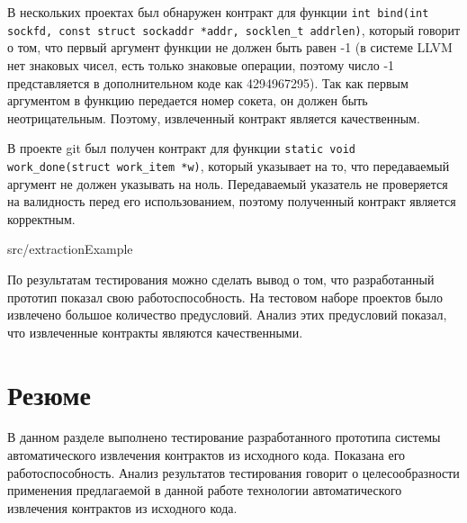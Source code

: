 В нескольких проектах был обнаружен контракт для функции \texttt{int bind(int sockfd, const struct sockaddr *addr, socklen_t addrlen)}, который говорит о том, что первый аргумент функции не должен быть равен -1 (в системе LLVM нет знаковых чисел, есть только знаковые операции, поэтому число -1 представляется в дополнительном коде как 4294967295). Так как первым аргументом в функцию передается номер сокета, он должен быть неотрицательным. Поэтому, извлеченный контракт является качественным.

В проекте git был получен контракт для функции \texttt{static void work_done(struct work_item *w)}, который указывает на то, что передаваемый аргумент не должен указывать на ноль. Передаваемый указатель не проверяется на валидность перед его использованием, поэтому полученный контракт является корректным.

{src/extractionExample}

По результатам тестирования можно сделать вывод о том, что разработанный прототип показал свою работоспособность. На тестовом наборе проектов было извлечено большое количество предусловий. Анализ этих предусловий показал, что извлеченные контракты являются качественными.

\section{Резюме}
В данном разделе выполнено тестирование разработанного прототипа системы автоматического извлечения контрактов из исходного кода. Показана его работоспособность. Анализ результатов тестирования говорит о целесообразности применения предлагаемой в данной работе технологии автоматического извлечения контрактов из исходного кода.